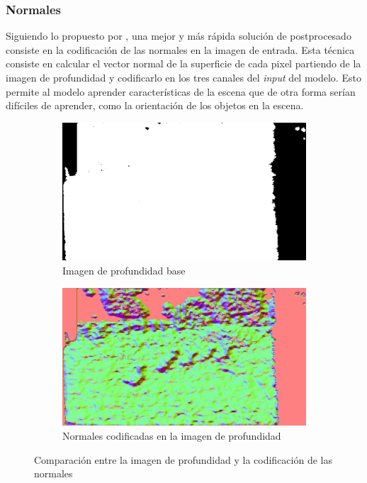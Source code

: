 \documentclass[12pt,a4paper]{report}
\begin{document}
\subsubsection{Normales}
\label{subsubsec:normals}
Siguiendo lo propuesto por \cite{eitel2015multimodaldeeplearningrobust}, una mejor y más rápida solución de postprocesado consiste en la codificación de las normales en la imagen de entrada. Esta técnica consiste en calcular el vector normal de la superficie de cada pixel partiendo de la imagen de profundidad y codificarlo en los tres canales del \textit{input} del modelo. Esto permite al modelo aprender características de la escena que de otra forma serían difíciles de aprender, como la orientación de los objetos en la escena.
\begin{figure}
    \centering
    \begin{subfigure}{0.45\textwidth}
        \centering
        \includegraphics[width=\textwidth]{media/data/depth_gueese.png}
        \caption{Imagen de profundidad base}
    \end{subfigure}
    \hfill
    \begin{subfigure}{0.45\textwidth}
        \centering
        \includegraphics[width=\textwidth]{media/data/normal_gueese.png}
        \caption{Normales codificadas en la imagen de profundidad}
    \end{subfigure}
    \caption{Comparación entre la imagen de profundidad y la codificación de las normales}
    \label{fig:depth-normals-comparison}
\end{figure}
\end{document}
